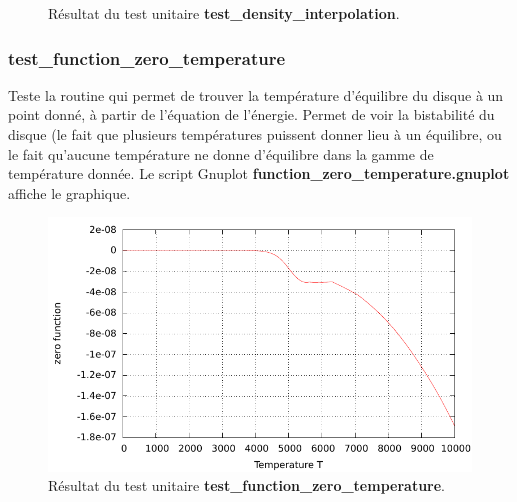 \begin{figure}[htbp]
\centering
{}\hfill
{}

\caption{Résultat du test unitaire \textbf{test\_density\_interpolation}.}
\end{figure}

\subsubsection{test\_function\_zero\_temperature}
Teste la routine qui permet de trouver la température d'équilibre du disque à un point donné, à partir de l'équation de l'énergie. Permet de voir la bistabilité du disque (le fait que plusieurs températures puissent donner lieu à un équilibre, ou le fait qu'aucune température ne donne d'équilibre dans la gamme de température donnée. Le script Gnuplot \textbf{function\_zero\_temperature.gnuplot} affiche le graphique.

\begin{figure}[htbp]
\centering
\includegraphics[width=0.65\linewidth]{figure/unitary_tests/function_zero_temperature.pdf}
\caption{Résultat du test unitaire \textbf{test\_function\_zero\_temperature}.}
\end{figure}

